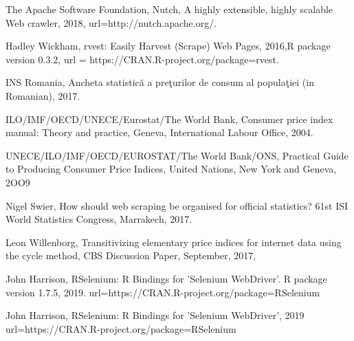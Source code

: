 \documentclass[]{article}
\begin{document}
\begin{thebibliography}{99}
The Apache Software Foundation,
Nutch, A highly extensible, highly scalable Web crawler, 2018,
url={http://nutch.apache.org/}.

Hadley Wickham,
rvest: Easily Harvest (Scrape) Web Pages,
2016,{R package version 0.3.2},
url = {https://CRAN.R-project.org/package=rvest}.


INS Romania, Ancheta statistică a preţurilor de consum al populaţiei (in Romanian),
2017.

ILO/IMF/OECD/UNECE/Eurostat/The World Bank,
Consumer price index manual: Theory and practice,
Geneva, International Labour Office, 2004.

UNECE/ILO/IMF/OECD/EUROSTAT/The World Bank/ONS, 
Practical Guide to Producing Consumer Price Indices, 
United Nations, New York and Geneva, 2OO9


Nigel Swier, 
How should web scraping be organised for official statistics? 
61st ISI World Statistics Congress, Marrakech, 2017.


Leon Willenborg,
Transitivizing elementary price indices for internet data using the cycle method,
CBS Discussion Paper, September, 2017,


John Harrison, 
RSelenium: R Bindings for 'Selenium WebDriver'. R package version 1.7.5, 2019.
url={https://CRAN.R-project.org/package=RSelenium}

John Harrison,
RSelenium: R Bindings for 'Selenium WebDriver', 2019
url={https://CRAN.R-project.org/package=RSelenium}



\end{thebibliography}
\end{document}
